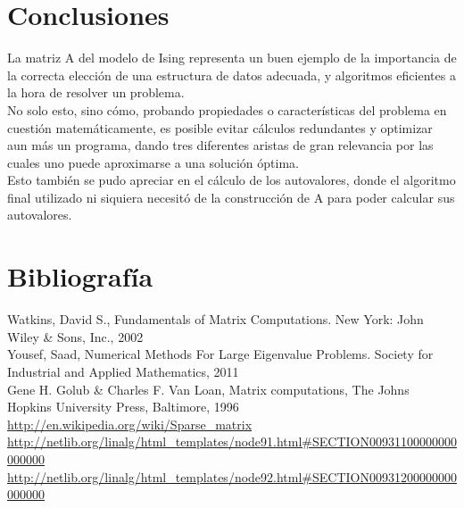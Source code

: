 \documentclass[a4paper,11pt]{article}
\begin{document}
\section{Conclusiones}
La matriz A del modelo de Ising representa un buen ejemplo de la importancia de
la correcta elecci\'on de una estructura de datos adecuada, y algoritmos
eficientes a la hora de resolver un problema.\\
No solo esto, sino c\'omo, probando propiedades o caracter\'isticas del
problema en cuesti\'on matem\'aticamente, es posible evitar cálculos
redundantes y optimizar aun m\'as un programa, dando tres diferentes aristas de
gran relevancia por las cuales uno puede aproximarse a una soluci\'on \'optima.\\
Esto tambi\'en se pudo apreciar en el c\'alculo de los autovalores, donde el
algoritmo final utilizado ni siquiera necesit\'o de la construcci\'on de A para
poder calcular sus autovalores.

\paragraph{}
\newpage
\section{Bibliograf\'ia}
Watkins, David S., Fundamentals of Matrix Computations. New York: John Wiley \&
Sons, Inc., 2002\\
Yousef, Saad, Numerical Methods For Large Eigenvalue Problems. Society for
Industrial and Applied Mathematics, 2011\\
Gene H. Golub \& Charles F. Van Loan, Matrix computations, The Johns Hopkins
University Press, Baltimore, 1996\\
\url{http://en.wikipedia.org/wiki/Sparse_matrix}
\url{http://netlib.org/linalg/html_templates/node91.html#SECTION00931100000000000000}
\url{http://netlib.org/linalg/html_templates/node92.html#SECTION00931200000000000000}
\end{document}
